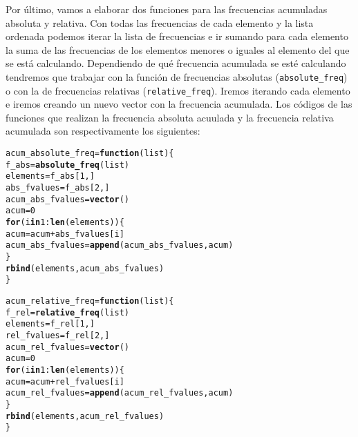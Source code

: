 \documentclass[12pt]{report}\usepackage[]{graphicx}\usepackage[dvipsnames]{xcolor}
\makeatletter
\newcommand{\hlnum}[1]{\textcolor[rgb]{0.686,0.059,0.569}{#1}}%
\newcommand{\hlopt}[1]{\textcolor[rgb]{0,0,0}{#1}}%
\newcommand{\hlstd}[1]{\textcolor[rgb]{0.345,0.345,0.345}{#1}}%
\newcommand{\hlkwa}[1]{\textcolor[rgb]{0.161,0.373,0.58}{\textbf{#1}}}%
\newcommand{\hlkwb}[1]{\textcolor[rgb]{0.69,0.353,0.396}{#1}}%
\newcommand{\hlkwc}[1]{\textcolor[rgb]{0.333,0.667,0.333}{#1}}%
\newcommand{\hlkwd}[1]{\textcolor[rgb]{0.737,0.353,0.396}{\textbf{#1}}}%
\newenvironment{kframe}{%
 \def\at@end@of@kframe{}%
 \ifinner\ifhmode%
  \def\at@end@of@kframe{\end{minipage}}%
  \begin{minipage}{\columnwidth}%
 \fi\fi%
 \def\FrameCommand##1{\hskip\@totalleftmargin \hskip-\fboxsep
 \colorbox{shadecolor}{##1}\hskip-\fboxsep
     \hskip-\linewidth \hskip-\@totalleftmargin \hskip\columnwidth}%
 \MakeFramed {\advance\hsize-\width
   \@totalleftmargin\z@ \linewidth\hsize
   \@setminipage}}%
 {\par\unskip\endMakeFramed%
 \at@end@of@kframe}
\newenvironment{knitrout}{}{} %
\makeatother
\begin{document}
			Por último, vamos a elaborar dos funciones para las frecuencias acumuladas absoluta y relativa. Con todas las frecuencias de cada elemento y la lista ordenada podemos iterar la lista de frecuencias e ir sumando para cada elemento la suma de las frecuencias de los elementos menores o iguales al elemento del que se está calculando. Dependiendo de qué frecuencia acumulada se esté calculando tendremos que trabajar con la función de frecuencias absolutas (\texttt{absolute\_freq}) o con la de frecuencias relativas (\texttt{relative\_freq}). Iremos iterando cada elemento e iremos creando un nuevo vector con la frecuencia acumulada. Los códigos de las funciones que realizan la frecuencia absoluta acuulada y la frecuencia relativa acumulada son respectivamente los siguientes:
			
\begin{knitrout}
\color{fgcolor}\begin{kframe}
\begin{alltt}
\hlstd{acum_absolute_freq} \hlkwb{=} \hlkwa{function}\hlstd{(}\hlkwc{list}\hlstd{)\{}
        \hlstd{f_abs} \hlkwb{=} \hlkwd{absolute_freq}\hlstd{(list)}
        \hlstd{elements} \hlkwb{=} \hlstd{f_abs[}\hlnum{1}\hlstd{,]}
        \hlstd{abs_fvalues} \hlkwb{=} \hlstd{f_abs[}\hlnum{2}\hlstd{,]}
        \hlstd{acum_abs_fvalues} \hlkwb{=} \hlkwd{vector}\hlstd{()}
        \hlstd{acum} \hlkwb{=} \hlnum{0}
        \hlkwa{for} \hlstd{(i} \hlkwa{in} \hlnum{1}\hlopt{:}\hlkwd{len}\hlstd{(elements))\{}
                \hlstd{acum} \hlkwb{=} \hlstd{acum} \hlopt{+} \hlstd{abs_fvalues[i]}
                \hlstd{acum_abs_fvalues} \hlkwb{=} \hlkwd{append}\hlstd{(acum_abs_fvalues, acum)}
        \hlstd{\}}
        \hlkwd{rbind}\hlstd{(elements, acum_abs_fvalues)}
\hlstd{\}}
\end{alltt}
\end{kframe}
\end{knitrout}
			
\begin{knitrout}
\color{fgcolor}\begin{kframe}
\begin{alltt}
\hlstd{acum_relative_freq} \hlkwb{=} \hlkwa{function}\hlstd{(}\hlkwc{list}\hlstd{)\{}
\hlstd{f_rel} \hlkwb{=} \hlkwd{relative_freq}\hlstd{(list)}
\hlstd{elements} \hlkwb{=} \hlstd{f_rel[}\hlnum{1}\hlstd{,]}
\hlstd{rel_fvalues} \hlkwb{=} \hlstd{f_rel[}\hlnum{2}\hlstd{,]}
\hlstd{acum_rel_fvalues} \hlkwb{=} \hlkwd{vector}\hlstd{()}
\hlstd{acum} \hlkwb{=} \hlnum{0}
\hlkwa{for} \hlstd{(i} \hlkwa{in} \hlnum{1}\hlopt{:}\hlkwd{len}\hlstd{(elements))\{}
        \hlstd{acum} \hlkwb{=} \hlstd{acum} \hlopt{+} \hlstd{rel_fvalues[i]}
        \hlstd{acum_rel_fvalues} \hlkwb{=} \hlkwd{append}\hlstd{(acum_rel_fvalues, acum)}
\hlstd{\}}
\hlkwd{rbind}\hlstd{(elements, acum_rel_fvalues)}
\hlstd{\}}
\end{alltt}
\end{kframe}
\end{knitrout}
			
\end{document}
